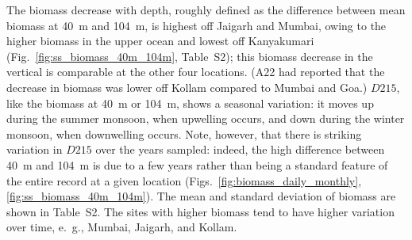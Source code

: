 \documentclass[authoryear,review,11pt]{elsarticle}
\begin{document}

The biomass decrease with depth, roughly defined as the difference between mean biomass at 40~m and 104~m, is highest off Jaigarh and Mumbai, owing to the higher biomass in the upper ocean and lowest off Kanyakumari (Fig.~\ref{fig:ss_biomass_40m_104m}, Table~S2); this biomass decrease in the vertical is comparable at the other four locations. (A22 had reported that the decrease in biomass was lower off Kollam compared to Mumbai and Goa.) $D215$, like the biomass at 40~m or 104~m, shows a seasonal variation: it moves up during the summer monsoon, when upwelling occurs, and down during the winter monsoon, when downwelling occurs.  Note, however, that there is striking variation in $D215$ over the years sampled: indeed, the high difference between 40~m and 104~m is due to a few years rather than being a standard feature of the entire record at a given location (Figs.~\ref{fig:biomass_daily_monthly},\ref{fig:ss_biomass_40m_104m}). The mean and standard deviation of biomass are shown in Table~S2. The sites with higher biomass tend to have higher variation over time, e.~g., Mumbai, Jaigarh, and Kollam.
\end{document}
